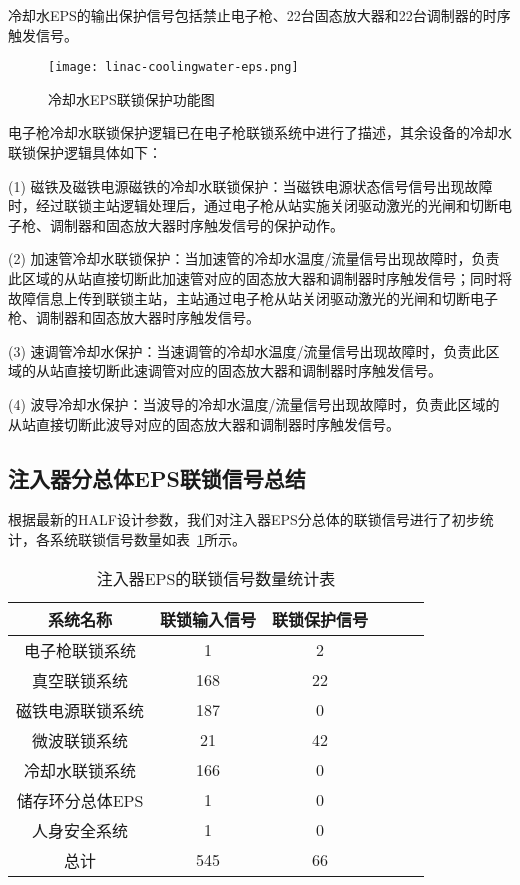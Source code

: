 冷却水EPS的输出保护信号包括禁止电子枪、22台固态放大器和22台调制器的时序触发信号。

\begin{figure}[!htb]
	\centering
	\texttt{[image: linac-coolingwater-eps.png]}
	\caption{冷却水EPS联锁保护功能图}
	\label{fig:linac-coolingwater-eps}
\end{figure}

电子枪冷却水联锁保护逻辑已在电子枪联锁系统中进行了描述，其余设备的冷却水联锁保护逻辑具体如下：

(1) 磁铁及磁铁电源磁铁的冷却水联锁保护：当磁铁电源状态信号信号出现故障时，经过联锁主站逻辑处理后，通过电子枪从站实施关闭驱动激光的光闸和切断电子枪、调制器和固态放大器时序触发信号的保护动作。

(2) 加速管冷却水联锁保护：当加速管的冷却水温度/流量信号出现故障时，负责此区域的从站直接切断此加速管对应的固态放大器和调制器时序触发信号；同时将故障信息上传到联锁主站，主站通过电子枪从站关闭驱动激光的光闸和切断电子枪、调制器和固态放大器时序触发信号。

(3) 速调管冷却水保护：当速调管的冷却水温度/流量信号出现故障时，负责此区域的从站直接切断此速调管对应的固态放大器和调制器时序触发信号。

(4) 波导冷却水保护：当波导的冷却水温度/流量信号出现故障时，负责此区域的从站直接切断此波导对应的固态放大器和调制器时序触发信号。

\subsection{注入器分总体EPS联锁信号总结}

根据最新的HALF设计参数，我们对注入器EPS分总体的联锁信号进行了初步统计，各系统联锁信号数量如表~\ref{table:4.2}所示。

\begin{table}[!hbt]
  \centering
  \caption{注入器EPS的联锁信号数量统计表}
  \label{table:4.2} 
  \begin{center}
  \begin{tabular}{cccccc}
    \toprule

     系统名称&联锁输入信号&联锁保护信号\\
    \midrule
    电子枪联锁系统& 1& 2 \\
    
    真空联锁系统  & 168 & 22 \\
    
    磁铁电源联锁系统 &187 & 0\\
    
    微波联锁系统 & 21 & 42 \\
    
    冷却水联锁系统  & 166& 0\\

    储存环分总体EPS & 1& 0\\
    
    人身安全系统& 1& 0\\

    总计&545& 66\\

    \bottomrule
  \end{tabular}
\end{center}
\end{table}


